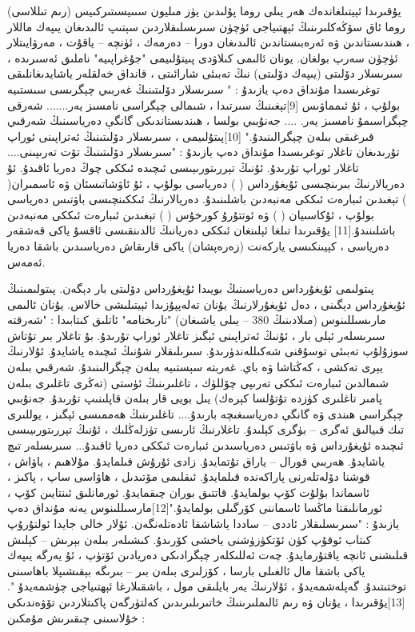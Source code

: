 \documentclass[a4paper]{article}
\begin{document}
يۇقىرىدا ئېيتىلغاندەك ھەر يىلى روما پۇلىدىن يۈز مىليون سىىيسىتىركىيس (رىم تىللاسى) روما ئاق سۆڭەكلىرىنىڭ ئېھتىياجى ئۈچۈن سىرىسلىقلاردىن سېتىپ ئالىدىغان يىپەك ماللار ، ھىندىستاندىن ۋە ئەرەبىستاندىن ئالىدىغان دورا – دەرمەك ، ئۈنچە – ياقۇت ، مەرۋايىتلار ئۈچۈن سەرپ بولغان. يونان ئالىمى كىلاۋدى پىيتۇلىيمى "جۇغراپىيە" ناملىق ئەسىرىدە ، سىرىسلار دۆلىتى (يىپەك دۆلىتى) نىڭ تەبىئى شارائىتى ، قانداق خەلقلەر ياشايدىغانلىقى توغرىسىدا مۇنداق دەپ يازىدۇ : " سىرىسلار دۆلىتىنىڭ غەربىي چېگرىسى سىستىيە بولۇپ ، ئۇ ئىمماۋىس [9]تېغىنىڭ سىرتىدا ، شىمالى چېگراسى نامسىز يەر....... شەرقى چېگراسىمۇ نامسىز يەر. .... جەنۇبىي بولسا ، ھىندىستاندىكى گانگې دەرياسىنىڭ شەرقىي قىرغىقى بىلەن چېگرالىنىدۇ." [10]پىتۇلىيمى ، سىرىسلار دۆلىتىنىڭ ئەتراپىنى ئوراپ تۇرىدىغان تاغلار توغرىسىدا مۇنداق دەپ يازىدۇ : "سىرىسلار دۆلىتىنىڭ تۆت تەرىپىنى.... تاغلار ئوراپ تۇرىدۇ. ئۇنىڭ تېررىتورىيىسى ئىچىدە ئىككى چوڭ دەريا ئاقىدۇ. ئۇ دەريالارنىڭ بىرىنچىسى ئۇيغۇرداس ( ) دەرياسى بولۇپ ، ئۇ ئاۋشاتىسئان ۋە ئاسمىران( ) تېغىدىن ئىبارەت ئىككى مەنبەدىن باشلىنىدۇ. دەريالارنىڭ ئىككىنچىسى باۋتىس دەرياسى بولۇپ ، ئۇكاسىيان ( ) ۋە ئوتتۇرۇ كورخۇس ( ) تېغىدىن ئىبارەت ئىككى مەنبەدىن باشلىنىدۇ.[11] يۇقىرىدا تىلغا ئېلىنغان ئىككى دەريانىڭ ئالدىنقىسى ئاقسۇ ياكى قەشقەر دەرياسى ، كېيىنكىسى ياركەنت (زەرەپشان) ياكى قارىقاش دەرياسىدىن باشقا دەريا ئەمەس.



پىتولىمى ئۇيغۇرداس دەرياسىنىڭ بويىدا ئۇيغۇرداس دۆلىتى بار دېگەن. پىتولىمىنىڭ ئۇيغۇرداس دېگىنى ، دەل ئۇيغۇرلارنىڭ يۇنان تەلەپپۇزىدا ئېيتىلىشى خالاس. يۇنان ئالىمى مارىسىللىنوس (مىلادىنىڭ 380 – يىلى ياشىغان) "تارىخنامە" ئاتلىق كىتابىدا : "شەرقتە سىرىسلەر ئېلى بار ، ئۇنىڭ ئەتراپىنى ئېگىز تاغلار ئوراپ تۇرىدۇ. بۇ تاغلار بىر تۇتاش سوزۇلۇپ تەبىئى توسۇقنى شەكىللەندۈرىدۇ. سىرىلىقلار شۇنىڭ ئىچىدە ياشايدۇ. ئۇلارنىڭ يېرى تەكشى ، كەڭتاشا ۋە باي. غەربتە سېستىيە بىلەن چېگرالىنىدۇ. شەرقىي بىلەن شىمالدىن ئىبارەت ئىككى تەرىپى چۆللۈك ، تاغلىرىنىڭ ئۈستى (تەڭرى تاغلىرى بىلەن پامىر تاغلىرى كۈزدە تۇتۇلسا كېرەك) يىل بويى قار بىلەن قاپلىنىپ تۇرىدۇ. جەنۇبىي چېگراسى ھىندى ۋە گانگې دەرياسىغىچە بارىدۇ.... تاغلىرىنىڭ ھەممىسى ئېگىز ، يوللىرى تىك قىيالىق ئەگرى – بۈگرى كېلىدۇ. تاغلارنىڭ ئارىسى تۈزلەڭلىك ، ئۇنىڭ تېررىتورىيىسى ئىچىدە ئۇيغۇرداس ۋە باۋتىس دەرياسىدىن ئىبارەت ئىككى دەريا ئاقىدۇ... سىرىسلەر تىچ ياشايدۇ. ھەربىي قورال – ياراق تۇتمايدۇ. زادى ئۇرۇش قىلمايدۇ. مۇلاھىم ، ياۋاش ، قوشنا دۆلەتلەرنى پاراكەندە قىلمايدۇ. ئىقلىمى مۆتىدىل ، ھاۋاسى ساپ ، پاكىز ، ئاسماندا بۇلۇت كۆپ بولمايدۇ. قاتتىق بوران چىقمايدۇ. ئورمانلىق ئىنتايىن كۆپ ، ئورمانلىقتا ماڭسا ئاسماننى كۆرگىلى بولمايدۇ."[12]مارسىللىنوس يەنە مۇنداق دەپ يازىدۇ : "سىرىسلىقلار ئاددى – ساددا ياشاشقا ئادەتلەنگەن. ئۇلار خالى جايدا ئولتۇرۇپ كىتاب ئوقۇپ كۈن ئۆتكۈزۈشنى ياخشى كۆرىدۇ. كىشىلەر بىلەن بېرىش – كېلىش قىلىشنى ئانچە ياقتۇرمايدۇ. چەت ئەللىكلەر چېگرادىكى دەريادىن ئۆتۈپ ، ئۇ يەرگە يىپەك ياكى باشقا مال ئالغىلى بارسا ، كۆزلىرى بىلەن بىر – بىرىگە بېقىشىپلا باھاسىنى توختىتىدۇ. گەپلەشمەيدۇ ، ئۇلارنىڭ يەر بايلىقى مول ، باشقىلارغا ئېھتىياجى چۈشمەيدۇ ".[13]يۇقىرىدا ، يۇنان ۋە رىم ئالىملىرىنىڭ خاتىرىلىرىدىن كەلتۈرگەن پاكىتلاردىن تۆۋەندىكى خۇلاسىنى چىقىرىش مۇمكىن :
\end{document}
